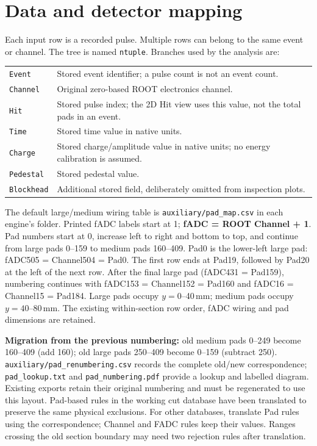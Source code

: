 \documentclass[11pt,a4paper]{article}
\begin{document}
\section{Data and detector mapping}
Each input row is a recorded pulse. Multiple rows can belong to the same event or
channel. The tree is named \texttt{ntuple}. Branches used by the analysis are:
\begin{longtable}{p{.20\linewidth}p{.73\linewidth}}
\texttt{Event} & Stored event identifier; a pulse count is not an event count.\\
\texttt{Channel} & Original zero-based ROOT electronics channel.\\
\texttt{Hit} & Stored pulse index; the 2D Hit view uses this value, not the total pads in an event.\\
\texttt{Time} & Stored time value in native units.\\
\texttt{Charge} & Stored charge/amplitude value in native units; no energy calibration is assumed.\\
\texttt{Pedestal} & Stored pedestal value.\\
\texttt{Blockhead} & Additional stored field, deliberately omitted from inspection plots.\\
\end{longtable}
The default large/medium wiring table is \texttt{auxiliary/pad\_map.csv} in each engine's
folder. Printed fADC labels start at 1; \textbf{fADC = ROOT Channel + 1}.
Pad numbers start at 0, increase left to right and bottom to top, and continue from
large pads 0--159 to medium pads 160--409. Pad0 is the lower-left large pad:
fADC505 = Channel504 = Pad0. The first row ends at Pad19, followed by Pad20
at the left of the next row. After the final large pad (fADC431 = Pad159),
numbering continues with fADC153 = Channel152 = Pad160 and fADC16 = Channel15 = Pad184.
Large pads occupy $y=0$--40\,mm; medium pads occupy $y=40$--80\,mm.
The existing within-section row order, fADC wiring and pad dimensions are retained.

\textbf{Migration from the previous numbering:} old medium pads 0--249 become
160--409 (add 160); old large pads 250--409 become 0--159 (subtract 250).
\texttt{auxiliary/pad\_renumbering.csv} records the complete old/new correspondence;
\texttt{pad\_lookup.txt} and \texttt{pad\_numbering.pdf} provide a lookup and labelled diagram.
Existing exports retain their original numbering and must be regenerated to use this layout.
Pad-based rules in the working cut database have been translated to preserve the
same physical exclusions. For other databases, translate Pad rules using the correspondence;
Channel and FADC rules keep their values. Ranges crossing the old section boundary
may need two rejection rules after translation.
\end{document}

